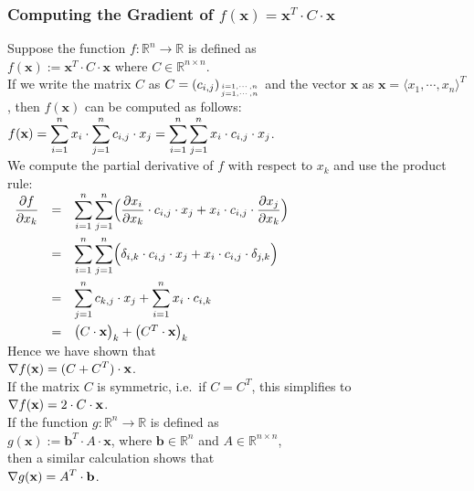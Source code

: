 \subsubsection{Computing the Gradient of $f(\mathbf{x}) = \mathbf{x}^T \cdot C \cdot \mathbf{x}$}
Suppose the function $f:\mathbb{R}^n \rightarrow \mathbb{R}$ is defined as
\\[0.2cm]
\hspace*{1.3cm}
$f(\mathbf{x}) := \mathbf{x}^T \cdot C \cdot \mathbf{x}$ \quad where $C \in \mathbb{R}^{n \times n}$.
\\[0.2cm]
If we write the matrix $C$ as $C = (c_{i,j})_{i=1,\cdots,n \atop j=1,\cdots,n}$ and the vector
$\mathbf{x}$ as $\mathbf{x} = \langle x_1, \cdots, x_n \rangle^T$,  then $f(\mathbf{x})$ can be
computed as follows:
\\[0.2cm]
\hspace*{1.3cm}
$\displaystyle f(\mathbf{x}) = \sum\limits_{i=1}^n x_i \cdot \sum\limits_{j=1}^n c_{i,j} \cdot x_j 
                   = \sum\limits_{i=1}^n \sum\limits_{j=1}^n x_i \cdot c_{i,j} \cdot x_j
$.
\\[0.2cm]
We compute the partial derivative of $f$ with respect to $x_k$ and use the product rule:
\\[0.2cm]
\hspace*{1.3cm}
$
\begin{array}[t]{lcl}
\displaystyle \frac{\partial f}{\partial x_k} & = &
\displaystyle \sum\limits_{i=1}^n \sum\limits_{j=1}^n \Bigl(
    \frac{\partial x_i}{\partial x_k} \cdot c_{i,j} \cdot x_j + x_i \cdot c_{i,j} \cdot \frac{\partial x_j}{\partial x_k}
    \Bigr) \\[0.5cm]
& = &
\displaystyle \sum\limits_{i=1}^n \sum\limits_{j=1}^n \Bigl(
    \delta_{i,k} \cdot c_{i,j} \cdot x_j + x_i \cdot c_{i,j} \cdot \delta_{j,k} \Bigr) \\[0.5cm]
& = &
\displaystyle \sum\limits_{j=1}^n c_{k,j} \cdot x_j + \sum\limits_{i=1}^n x_i \cdot c_{i,k} \\[0.5cm]
& = &
  \bigl(C \cdot \mathbf{x}\bigr)_k + \bigl(C^T \cdot \mathbf{x}\bigr)_k
\end{array}
$
\\[0.2cm]
Hence we have shown that 
\\[0.2cm]
\hspace*{1.3cm}
$\displaystyle \nabla f(\mathbf{x}) = (C + C^T) \cdot \mathbf{x}$.
\\[0.2cm]
If the matrix $C$ is symmetric, i.e.~if $C = C^T$, this simplifies to
\\[0.2cm]
\hspace*{1.3cm}
$\displaystyle \nabla f(\mathbf{x}) = 2 \cdot C \cdot \mathbf{x}$.
\\[0.2cm]
If the function $g: \mathbb{R}^n \rightarrow \mathbb{R}$ is defined as 
\\[0.2cm]
\hspace*{1.3cm}
$g(\mathbf{x}) := \mathbf{b}^T \cdot A \cdot \mathbf{x}$, \quad where $\mathbf{b} \in \mathbb{R}^n$ and $A \in \mathbb{R}^{n \times n}$,
\\[0.2cm]
then a similar calculation shows that
\\[0.2cm]
\hspace*{1.3cm}
$\displaystyle \nabla g(\mathbf{x}) = A^T \cdot \mathbf{b}$.

